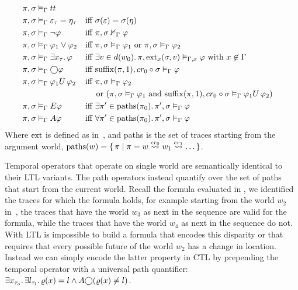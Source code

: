 \begin{align*}
  \pi, \sigma &\vDash_\Gamma tt \\
  \pi, \sigma &\vDash_\Gamma \varepsilon_\tau = \eta_\tau &&\text{iff } \sigma(\varepsilon) = \sigma(\eta) \\
  \pi, \sigma &\vDash_\Gamma \neg\varphi &&\text{iff } {\pi}, {\sigma} \nvDash_{\Gamma} {\varphi} \\
  \pi, \sigma &\vDash_\Gamma \varphi_1 \lor \varphi_2
      &&\text{iff } {\pi}, {\sigma} \vDash_{\Gamma} {\varphi_1} \text{ or } {\pi}, {\sigma} \vDash_{\Gamma} {\varphi_2} \\
  \pi, \sigma &\vDash_\Gamma \exists {x_\tau} \ldotp {\varphi}
      &&\text{iff } \exists {v \in d(w_0)} \ldotp {{\pi}, {\operatorname{ext}_x(\sigma, v)} \vDash_{\Gamma, x} {\varphi}}
        \text{ with } x \not\in \Gamma \\
  \pi, \sigma &\vDash_\Gamma \bigcirc{\varphi}
      &&\text{iff } {\operatorname{suffix}(\pi, 1)}, {cr_0 \circ \sigma} \vDash_{\Gamma} {\varphi} \\
  \pi, \sigma &\vDash_\Gamma {\varphi_1}U\,{\varphi_2}
      &&\text{iff } {\pi}, {\sigma} \vDash_{\Gamma} {\varphi_2} \\ &&&\quad\text{ or } ({\pi}, {\sigma} \vDash_{\Gamma} {\varphi_1}
        \text { and } {\operatorname{suffix}(\pi, 1)}, {cr_0 \circ \sigma} \vDash_{\Gamma} {{\varphi_1}U\,{\varphi_2}}) \\
  \pi, \sigma &\vDash_\Gamma E{\varphi}
      &&\text{iff } \exists {\pi' \in \operatorname{paths}(\pi_0)} \ldotp {{\pi'}, {\sigma} \vDash_{\Gamma} {\varphi}} \\
  \pi, \sigma &\vDash_\Gamma A{\varphi}
      &&\text{iff } \forall {\pi' \in \operatorname{paths}(\pi_0)} \ldotp {{\pi'}, {\sigma} \vDash_{\Gamma} {\varphi}} \\
\end{align*}
Where $\operatorname{ext}$ is defined as in~, and paths is the set of traces starting from the argument world,
$\operatorname{paths}(w) = \set{\pi | \pi = w \overset{cr_0}{\rightsquigarrow} w_1 \overset{cr_1}{\rightsquigarrow} \ldots}$.

Temporal operators that operate on single world are semantically identical to their \ac{LTL} variants. The path
operators instead quantify over the set of paths that start from the current world. Recall the formula evaluated in
, we identified the traces for which the formula holds, for example starting from the world $w_2$
in~, the traces that have the world $w_3$ as next in the sequence are valid for the formula,
while the traces that have the world $w_4$ as next in the sequence do not. With \ac{LTL} is impossible to build a
formula that encodes this disparity or that requires that every possible future of the world $w_2$ has a change in
location. Instead we can simply encode the latter property in \ac{CTL} by prepending the temporal operator with a
universal path quantifier: $\exists {x_{\tau_o}} \ldotp {\exists {l_{\tau_l}} \ldotp {\varrho(x) = l \land A{\bigcirc{(\varrho(x)
\neq l)}}}}$.

